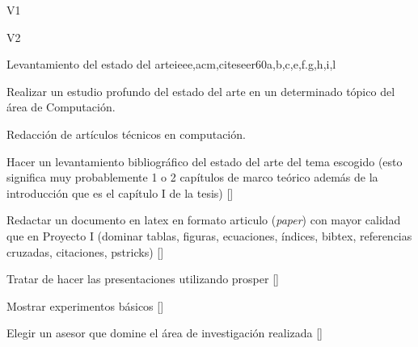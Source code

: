 \begin{syllabus}
\begin{competences}{V1}
\item {} 
\item {}
\item {}
\end{competences}

\begin{competences}{V2}
\item {} 
\item {}
\item {}
\end{competences}

\begin{unit}{Levantamiento del estado del arte}{}{ieee,acm,citeseer}{60}{a,b,c,e,f.g,h,i,l}
  \begin{topics}
      \item Realizar un estudio profundo del estado del arte en un determinado tópico del área de Computación.
      \item Redacción de artículos técnicos en computación.
  \end{topics}
  \begin{learningoutcomes}
      \item Hacer un levantamiento bibliográfico del estado del arte del tema escogido (esto significa muy probablemente 1 o 2 capítulos de marco teórico además de la introducción que es el capítulo I de la tesis) [\Usage]
      \item Redactar un documento en latex en formato articulo (\emph{paper}) con mayor calidad que en Proyecto I (dominar tablas, figuras, ecuaciones, índices, bibtex, referencias cruzadas, citaciones, pstricks) [\Usage]
      \item Tratar de hacer las presentaciones utilizando prosper [\Usage]
      \item Mostrar experimentos básicos [\Usage]
      \item Elegir un asesor que domine el área de investigación realizada [\Usage]
   \end{learningoutcomes}
\end{unit}

\begin{coursebibliography}
\end{coursebibliography}

\end{syllabus}
